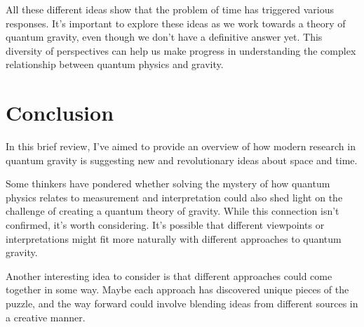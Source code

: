 \documentclass[11pt]{article}
\begin{document}
All these different ideas show that the problem of time has triggered various responses. It's important to explore these ideas as we work towards a theory of quantum gravity, even though we don't have a definitive answer yet. This diversity of perspectives can help us make progress in understanding the complex relationship between quantum physics and gravity.

\section{Conclusion}

In this brief review, I've aimed to provide an overview of how modern research in quantum gravity is suggesting new and revolutionary ideas about space and time.

Some thinkers have pondered whether solving the mystery of how quantum physics relates to measurement and interpretation could also shed light on the challenge of creating a quantum theory of gravity. While this connection isn't confirmed, it's worth considering. It's possible that different viewpoints or interpretations might fit more naturally with different approaches to quantum gravity.

Another interesting idea to consider is that different approaches could come together in some way. Maybe each approach has discovered unique pieces of the puzzle, and the way forward could involve blending ideas from different sources in a creative manner.

\newpage


\end{document}
